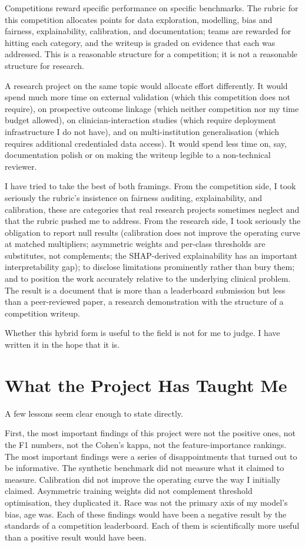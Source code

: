 Competitions reward specific performance on specific benchmarks. The rubric for this competition allocates points for data exploration, modelling, bias and fairness, explainability, calibration, and documentation; teams are rewarded for hitting each category, and the writeup is graded on evidence that each was addressed. This is a reasonable structure for a competition; it is not a reasonable structure for research.

A research project on the same topic would allocate effort differently. It would spend much more time on external validation (which this competition does not require), on prospective outcome linkage (which neither competition nor my time budget allowed), on clinician-interaction studies (which require deployment infrastructure I do not have), and on multi-institution generalisation (which requires additional credentialed data access). It would spend less time on, say, documentation polish or on making the writeup legible to a non-technical reviewer.

I have tried to take the best of both framings. From the competition side, I took seriously the rubric's insistence on fairness auditing, explainability, and calibration, these are categories that real research projects sometimes neglect and that the rubric pushed me to address. From the research side, I took seriously the obligation to report null results (calibration does not improve the operating curve at matched multipliers; asymmetric weights and per-class thresholds are substitutes, not complements; the SHAP-derived explainability has an important interpretability gap); to disclose limitations prominently rather than bury them; and to position the work accurately relative to the underlying clinical problem. The result is a document that is more than a leaderboard submission but less than a peer-reviewed paper, a research demonstration with the structure of a competition writeup.

Whether this hybrid form is useful to the field is not for me to judge. I have written it in the hope that it is.

\section{What the Project Has Taught Me}

A few lessons seem clear enough to state directly.

First, the most important findings of this project were not the positive ones, not the F1 numbers, not the Cohen's kappa, not the feature-importance rankings. The most important findings were a series of disappointments that turned out to be informative. The synthetic benchmark did not measure what it claimed to measure. Calibration did not improve the operating curve the way I initially claimed. Asymmetric training weights did not complement threshold optimisation, they duplicated it. Race was not the primary axis of my model's bias, age was. Each of these findings would have been a negative result by the standards of a competition leaderboard. Each of them is scientifically more useful than a positive result would have been.

